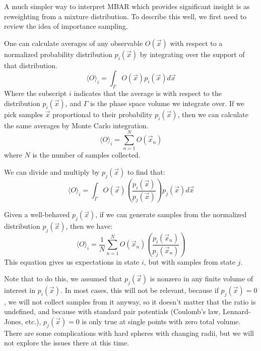 \documentclass[aps,pre,twocolumn,superscriptaddress]{revtex4-1}
\begin{document}
A much simpler way to interpret MBAR which provides significant
insight is as reweighting from a mixture distribution. To describe
this well, we first need to review the idea of importance sampling.

One can calculate averages of any observable $O(\vec{x})$ with respect
to a normalized probability distribution $p_i(\vec{x})$ by integrating over the
support of that distribution.
\[ \langle O \rangle_{i} = \int_{\Gamma} O(\vec{x}) p_i(\vec{x}) d\vec{x}\]
Where the subscript $i$ indicates that the average is with respect
to the distribution $p_i(\vec{x})$, and $\Gamma$ is the phase space volume
we integrate over. If we pick samples $\vec{x}$ proportional to their
probability $p_i(\vec{x})$, then we can calculate the same averages by
Monte Carlo integration.
\[ \langle O \rangle_{i} = \sum_{n=1}^{N} O(\vec{x}_n) \]
where $N$ is the number of samples collected.

We can divide and multiply by $p_j(\vec{x})$ to find that:
\[ \langle O \rangle_{i} = \int_{\Gamma} O(\vec{x}) \left(\frac{p_i(\vec{x})}{p_j(\vec{x})}\right) p_j(\vec{x}) d\vec{x}\]

Given a well-behaved $p_j(\vec{x})$, if we can generate samples from
the normalized distribution $p_j(\vec{x})$, then we have:
\[ \langle O \rangle_{i} = \frac{1}{N} \sum_{n=1}^N O(\vec{x}_n) \left(\frac{p_i(\vec{x}_n)}{p_j(\vec{x}_n)}\right) \] 
This equation gives us expectations in state $i$, but with samples
from state $j$. 

Note that to do this, we assumed that $p_j(\vec{x})$ is nonzero in any
finite volume of interest in $p_i(\vec{x})$. In most cases, this will
not be relevant, because if $p_j(\vec{x})=0$, we will not collect
samples from it anyway, so it doesn't matter that the ratio is
undefined, and because with standard pair potentials (Coulomb's law,
Lennard-Jones, etc.), $p_j(\vec{x})=0$ is only true at single points
with zero total volume.  There are some complications with hard
spheres with changing radii, but we will not explore the issues there
at this time.
\end{document}
